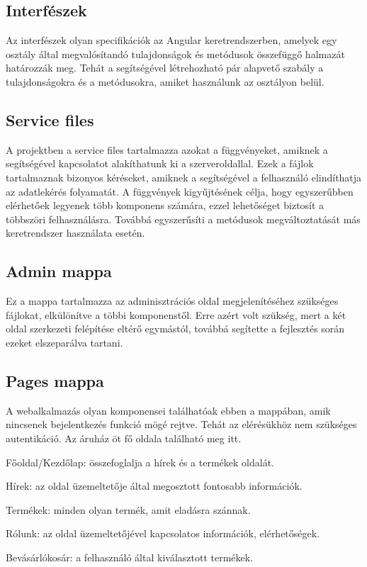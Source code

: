 \subsection{Interfészek}
Az interfészek\cite{interface} olyan specifikációk az Angular keretrendszerben, amelyek egy osztály által megvalósítandó tulajdonságok és metódusok összefüggő halmazát határozzák meg. Tehát a segítségével létrehozható pár alapvető szabály a tulajdonságokra és a metódusokra, amiket használunk az osztályon belül.

\subsection{Service files}
A projektben a service files\cite{service} tartalmazza azokat a függvényeket, amiknek a segítségével kapcsolatot alakíthatunk ki a szerveroldallal. Ezek a fájlok tartalmaznak bizonyos kéréseket, amiknek a segítségével a felhasználó elindíthatja az adatlekérés folyamatát. A függvények kigyűjtésének célja, hogy egyszerűbben elérhetőek legyenek több komponens számára, ezzel lehetőséget biztosít a többszöri felhasználásra. Továbbá egyszerűsíti a metódusok megváltoztatását más keretrendszer használata esetén.

\subsection{Admin mappa}
Ez a mappa tartalmazza az adminisztrációs oldal megjelenítéséhez szükséges fájlokat, elkülönítve a többi komponenstől. Erre azért volt szükség, mert a két oldal szerkezeti felépítése eltérő egymástól, továbbá segítette a fejlesztés során ezeket elszeparálva tartani.

\subsection{Pages mappa}
A webalkalmazás olyan komponensei találhatóak ebben a mappában, amik nincsenek bejelentkezés funkció mögé rejtve. Tehát az elérésükhöz nem szükséges autentikáció. Az áruház öt fő oldala található meg itt.

\begin{compactitem}
	\item Főoldal/Kezdőlap: összefoglalja a hírek és a termékek oldalát.
	\item Hírek: az oldal üzemeltetője által megosztott fontosabb információk.
	\item Termékek: minden olyan termék, amit eladásra szánnak.
	\item Rólunk: az oldal üzemeltetőjével kapcsolatos információk, elérhetőségek.
	\item Bevásárlókosár: a felhasználó által kiválasztott termékek.
\end{compactitem}

